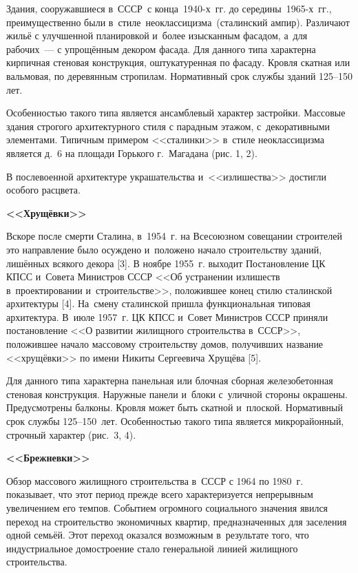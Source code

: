 Здания, сооружавшиеся в СССР с конца 1940-х~гг. до середины 1965-х~гг., преимущественно были в~стиле неоклассицизма (сталинский ампир). Различают жильё с улучшенной планировкой и~более изысканным фасадом, а~для рабочих~--- с упрощённым декором фасада. Для данного типа характерна кирпичная стеновая конструкция, оштукатуренная по фасаду. Кровля скатная или вальмовая, по деревянным стропилам. Нормативный срок службы зданий 125--150 лет.

Особенностью такого типа является ансамблевый характер застройки. Массовые здания строгого архитектурного стиля с парадным этажом, с~декоративными элементами. Типичным примером <<сталинки>> в~стиле неоклассицизма является д.~6 на площади Горького г.~Магадана (рис. 1, 2).

В послевоенной архитектуре украшательства и~<<излишества>> достигли особого расцвета.


\vspace{-0.5cm}
\textbf{<<Хрущёвки>>}

Вскоре после смерти Сталина, в~1954~г. на Всесоюзном совещании строителей это направление было осуждено и~положено начало строительству зданий, лишённых всякого декора [3].  В ноябре 1955~г. выходит Постановление ЦК КПСС и~Совета Министров СССР <<Об устранении излишеств в~проектировании и~строительстве>>, положившее конец стилю сталинской архитектуры [4]. На~смену сталинской пришла функциональная типовая архитектура. В~июле 1957~г. ЦК КПСС и~Совет Министров СССР приняли постановление <<О развитии жилищного строительства в~СССР>>, положившее начало массовому строительству домов, получивших название <<хрущёвки>> по имени Никиты Сергеевича Хрущёва [5].

Для данного типа характерна панельная или блочная сборная железобетонная стеновая конструкция. Наружные панели и~блоки с~уличной стороны окрашены. Предусмотрены балконы.  Кровля может быть скатной и~плоской. Нормативный срок службы 125--150~лет. Особенностью такого типа является микрорайонный, строчный характер (рис.~3, 4).



\textbf{<<Брежневки>>}

Обзор массового жилищного строительства в~СССР с 1964 по 1980~г. показывает, что этот период прежде всего характеризуется непрерывным увеличением его темпов. Событием огромного социального значения явился переход на строительство экономичных квартир, предназначенных для заселения одной семьёй. Этот переход оказался возможным в~результате того, что индустриальное домостроение стало генеральной линией жилищного строительства.

